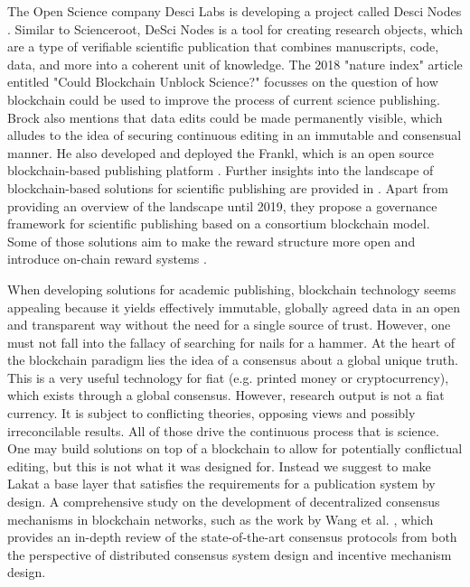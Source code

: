 The Open Science company Desci Labs is developing a project called Desci Nodes \cite{descilabs}. Similar to Scienceroot, DeSci Nodes is a tool for creating research objects, which are a type of verifiable scientific publication that combines manuscripts, code, data, and more into a coherent unit of knowledge.  
The 2018 "nature index" article \cite{brock2018} entitled "Could Blockchain Unblock Science?" focusses on the question of how blockchain could be used to improve the process of current science publishing. Brock also mentions that data edits could be made permanently visible, which alludes to the idea of securing continuous editing in an immutable and consensual manner. He also developed and deployed the Frankl, which is an open source blockchain-based publishing platform \cite{brockOpenScience2018}.
Further insights into the landscape of blockchain-based solutions for scientific publishing are provided in \cite{mackey2019framework}. Apart from providing an overview of the landscape until 2019, they propose a governance framework for scientific publishing based on a consortium blockchain model. Some of those solutions aim to make the reward structure more open and introduce on-chain reward systems \cite{calcaterra2018chain}.


When developing solutions for academic publishing, blockchain technology seems appealing because it yields effectively immutable, globally agreed data in an open and transparent way without the need for a single source of trust. However, one must not fall into the fallacy of searching for nails for a hammer. At the heart of the blockchain paradigm lies the idea of a consensus about a global unique truth. This is a very useful technology for fiat (e.g. printed money or cryptocurrency), which exists through a global consensus. However, research output is not a fiat currency. It is subject to conflicting theories, opposing views and possibly irreconcilable results. All of those drive the continuous process that is science. One may build solutions on top of a blockchain to allow for potentially conflictual editing, but this is not what it was designed for. Instead we suggest to make Lakat a base layer that satisfies the requirements for a publication system by design. A comprehensive study on the development of decentralized consensus mechanisms in blockchain networks, such as the work by Wang et al. \cite{wang2019survey}, which provides an in-depth review of the state-of-the-art consensus protocols from both the perspective of distributed consensus system design and incentive mechanism design.
   
